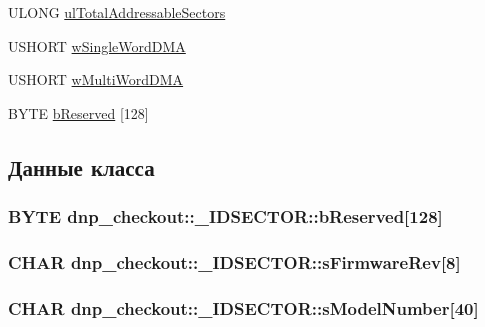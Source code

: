 \begin{DoxyCompactItemize}
\item 
U\-L\-O\-N\-G \hyperlink{structdnp__checkout_1_1___i_d_s_e_c_t_o_r_a9970b6af98047b0f2cfc93a4d56c9524}{ul\-Total\-Addressable\-Sectors}
\item 
U\-S\-H\-O\-R\-T \hyperlink{structdnp__checkout_1_1___i_d_s_e_c_t_o_r_aa39390ca7766d5d05875660ff3e88b21}{w\-Single\-Word\-D\-M\-A}
\item 
U\-S\-H\-O\-R\-T \hyperlink{structdnp__checkout_1_1___i_d_s_e_c_t_o_r_a15d6ba628bc86914417e43bce8655f02}{w\-Multi\-Word\-D\-M\-A}
\item 
B\-Y\-T\-E \hyperlink{structdnp__checkout_1_1___i_d_s_e_c_t_o_r_a6391daa2b5fa37a87e1d73ba76afea93}{b\-Reserved} \mbox{[}128\mbox{]}
\end{DoxyCompactItemize}


\subsection{Данные класса}
\hypertarget{structdnp__checkout_1_1___i_d_s_e_c_t_o_r_a6391daa2b5fa37a87e1d73ba76afea93}{
\subsubsection[{b\-Reserved}]{\setlength{\rightskip}{0pt plus 5cm}B\-Y\-T\-E dnp\-\_\-checkout\-::\-\_\-\-I\-D\-S\-E\-C\-T\-O\-R\-::b\-Reserved\mbox{[}128\mbox{]}}}\label{structdnp__checkout_1_1___i_d_s_e_c_t_o_r_a6391daa2b5fa37a87e1d73ba76afea93}
\hypertarget{structdnp__checkout_1_1___i_d_s_e_c_t_o_r_a0b942358d2fc3044f06adc9b5cc2df2b}{
\subsubsection[{s\-Firmware\-Rev}]{\setlength{\rightskip}{0pt plus 5cm}C\-H\-A\-R dnp\-\_\-checkout\-::\-\_\-\-I\-D\-S\-E\-C\-T\-O\-R\-::s\-Firmware\-Rev\mbox{[}8\mbox{]}}}\label{structdnp__checkout_1_1___i_d_s_e_c_t_o_r_a0b942358d2fc3044f06adc9b5cc2df2b}
\hypertarget{structdnp__checkout_1_1___i_d_s_e_c_t_o_r_a2ac2b59cfda99a4c48a4d7ab78895666}{
\subsubsection[{s\-Model\-Number}]{\setlength{\rightskip}{0pt plus 5cm}C\-H\-A\-R dnp\-\_\-checkout\-::\-\_\-\-I\-D\-S\-E\-C\-T\-O\-R\-::s\-Model\-Number\mbox{[}40\mbox{]}}}\label{structdnp__checkout_1_1___i_d_s_e_c_t_o_r_a2ac2b59cfda99a4c48a4d7ab78895666}
